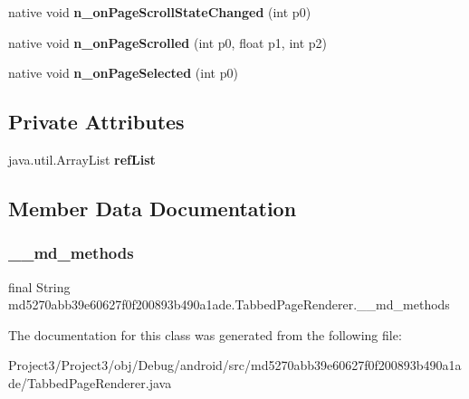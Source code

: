 \begin{DoxyCompactItemize}
native void {\bfseries n\+\_\+on\+Page\+Scroll\+State\+Changed} (int p0)
\item 
\mbox{\label{classmd5270abb39e60627f0f200893b490a1ade_1_1TabbedPageRenderer_a161ccbbec617373684ccbe9b5c3cfa50}} 
native void {\bfseries n\+\_\+on\+Page\+Scrolled} (int p0, float p1, int p2)
\item 
\mbox{\label{classmd5270abb39e60627f0f200893b490a1ade_1_1TabbedPageRenderer_a02722c0ec664951d4510f9693e12ce38}} 
native void {\bfseries n\+\_\+on\+Page\+Selected} (int p0)
\end{DoxyCompactItemize}
\subsection*{Private Attributes}
\begin{DoxyCompactItemize}
\item 
\mbox{\label{classmd5270abb39e60627f0f200893b490a1ade_1_1TabbedPageRenderer_a68463cfbc83b39600752261e37af0f3d}} 
java.\+util.\+Array\+List {\bfseries ref\+List}
\end{DoxyCompactItemize}


\subsection{Member Data Documentation}
\mbox{\label{classmd5270abb39e60627f0f200893b490a1ade_1_1TabbedPageRenderer_a61bf05aab3c9447ee5d368ab4be86a41}} 
\subsubsection{\texorpdfstring{\+\_\+\+\_\+md\+\_\+methods}{\_\_md\_methods}}
{\footnotesize\ttfamily final String md5270abb39e60627f0f200893b490a1ade.\+Tabbed\+Page\+Renderer.\+\_\+\+\_\+md\+\_\+methods\hspace{0.3cm}{\ttfamily [static]}}



The documentation for this class was generated from the following file\+:\begin{DoxyCompactItemize}
\item 
Project3/\+Project3/obj/\+Debug/android/src/md5270abb39e60627f0f200893b490a1ade/Tabbed\+Page\+Renderer.\+java\end{DoxyCompactItemize}
